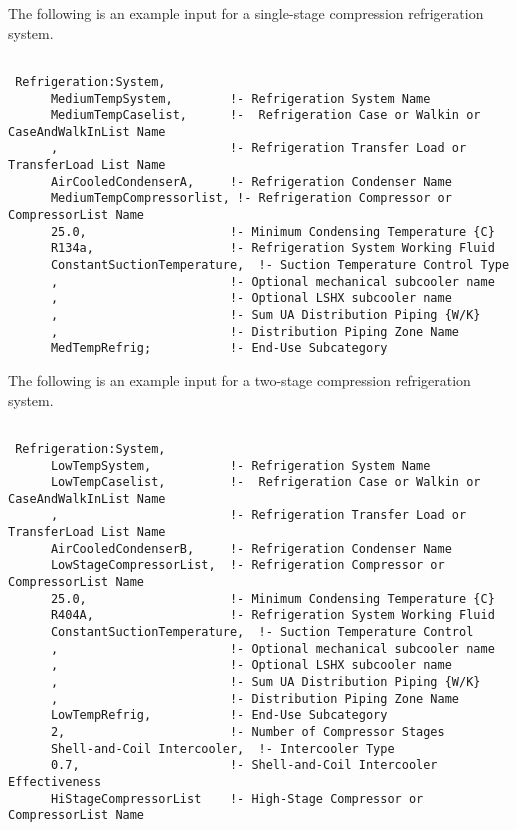 The following is an example input for a single-stage compression refrigeration system.

\begin{lstlisting}

 Refrigeration:System,
      MediumTempSystem,        !- Refrigeration System Name
      MediumTempCaselist,      !-  Refrigeration Case or Walkin or CaseAndWalkInList Name
      ,                        !- Refrigeration Transfer Load or TransferLoad List Name
      AirCooledCondenserA,     !- Refrigeration Condenser Name
      MediumTempCompressorlist, !- Refrigeration Compressor or CompressorList Name
      25.0,                    !- Minimum Condensing Temperature {C}
      R134a,                   !- Refrigeration System Working Fluid
      ConstantSuctionTemperature,  !- Suction Temperature Control Type
      ,                        !- Optional mechanical subcooler name
      ,                        !- Optional LSHX subcooler name
      ,                        !- Sum UA Distribution Piping {W/K}
      ,                        !- Distribution Piping Zone Name
      MedTempRefrig;           !- End-Use Subcategory
\end{lstlisting}

The following is an example input for a two-stage compression refrigeration system.

\begin{lstlisting}

 Refrigeration:System,
      LowTempSystem,           !- Refrigeration System Name
      LowTempCaselist,         !-  Refrigeration Case or Walkin or CaseAndWalkInList Name
      ,                        !- Refrigeration Transfer Load or TransferLoad List Name
      AirCooledCondenserB,     !- Refrigeration Condenser Name
      LowStageCompressorList,  !- Refrigeration Compressor or CompressorList Name
      25.0,                    !- Minimum Condensing Temperature {C}
      R404A,                   !- Refrigeration System Working Fluid
      ConstantSuctionTemperature,  !- Suction Temperature Control
      ,                        !- Optional mechanical subcooler name
      ,                        !- Optional LSHX subcooler name
      ,                        !- Sum UA Distribution Piping {W/K}
      ,                        !- Distribution Piping Zone Name
      LowTempRefrig,           !- End-Use Subcategory
      2,                       !- Number of Compressor Stages
      Shell-and-Coil Intercooler,  !- Intercooler Type
      0.7,                     !- Shell-and-Coil Intercooler Effectiveness
      HiStageCompressorList    !- High-Stage Compressor or CompressorList Name
\end{lstlisting}

